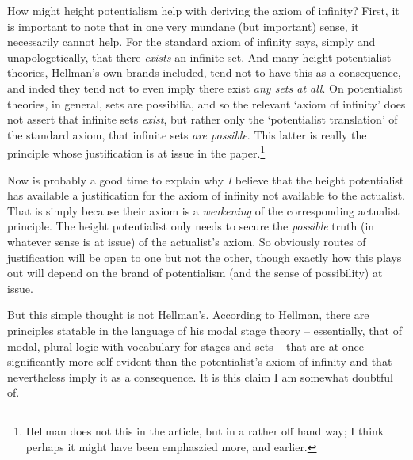 \documentclass{amsart}
\theoremstyle{definition}
\begin{document}
How might height potentialism help with deriving the axiom of infinity? 
First, it is important to note that in one very mundane (but important) sense,
it necessarily cannot help. For the standard axiom of infinity says, 
simply and unapologetically, 
that there \emph{exists} an infinite set. And many height potentialist theories, 
Hellman's own brands included, 
tend not to have this as a consequence, and inded they tend not 
to even imply there exist \emph{any sets at all}. 
On potentialist theories, in general, sets are possibilia, 
and so the relevant `axiom of infinity' does not assert that 
infinite sets \emph{exist}, but rather 
only the `potentialist translation' of the standard axiom, 
that infinite sets \emph{are possible}. 
This latter is really the principle 
whose justification is at issue in the paper.\footnote{ 
    Hellman does not this in the article, but in a rather off hand way;
    I think perhaps it might have been emphaszied more, and earlier.
    }

Now is probably a good time to explain why 
\emph{I} 
believe that the height potentialist 
has available a justification for the axiom of infinity 
not available to the actualist. 
That is simply because their axiom is a 
\emph{ weakening } 
of the corresponding actualist principle. 
The height potentialist only needs to secure the 
\emph{possible} 
truth 
(in whatever sense is at issue) 
of the actualist's axiom. So obviously routes of justification 
will be open to one but not the other, though exactly how this plays out 
will depend on the brand of potentialism (and the sense of possibility) at issue.

But this simple thought is not Hellman's. 
According to Hellman, 
there are principles statable in the language of his modal stage theory 
-- essentially, that of modal, plural logic with 
vocabulary for stages and sets --
that are at once significantly more self-evident
than the potentialist's axiom of infinity 
and that nevertheless imply it as a consequence. 
It is this claim I am somewhat doubtful of.
\end{document}
